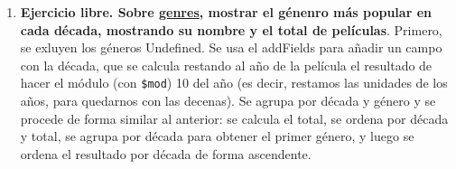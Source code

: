 \documentclass[a4paper,onecolumn]{article}
\begin{document}
\begin{sloppypar}
\begin{enumerate}
\begin{figure}[H]
    \end{figure}
    \item \textbf{Ejercicio libre. Sobre \underline{genres}, mostrar el génenro más popular en cada década, mostrando su nombre y el total de películas}. 
    Primero, se exluyen los géneros Undefined. Se usa el addFields para añadir un campo con la década, que se calcula restando al año de la película el resultado de hacer el módulo
    (con \texttt{\$mod}) 10 del año (es decir, restamos las unidades de los años, para quedarnos con las decenas). Se agrupa por década y género y se procede de forma similar al anterior:
    se calcula el total, se ordena por década y total, se agrupa por década para obtener el primer género, y luego se ordena el resultado por década de forma ascendente.
    \begin{figure}[H]
        \begin{subfigure}[b]{0.6\textwidth}
            \centering
        \end{subfigure}
        \hfill
        \begin{subfigure}[b]{0.4\textwidth}

\end{subfigure}
\end{figure}
\end{enumerate}
\end{sloppypar}
\end{document}
